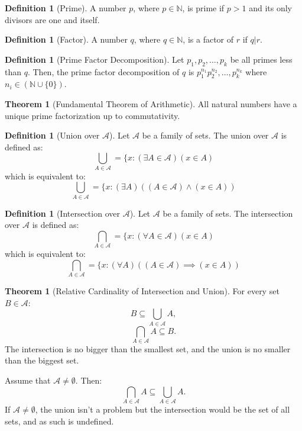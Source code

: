 \documentclass[10pt]{article}
\theoremstyle{definition}
\newtheorem{definition}[equation]{Definition}
\newtheorem{theorem}[equation]{Theorem}
\newcommand{\N}{\mathbb{N}}
\begin{document}
\begin{definition}[Prime]
    A number $p$, where $p\in\N$, is prime if $p>1$ and its only divisors are one and itself.
\end{definition}

\begin{definition}[Factor]
  A number $q$, where $q\in\N$, is a factor of $r$ if $q|r$.
\end{definition}

\begin{definition}[Prime Factor Decomposition]
  Let $p_1,p_2,\dots,p_k$ be all primes less than $q$. Then, the prime factor decomposition of $q$ is $p_1^{n_1} p_2^{n_2},\dots, p_k^{n_k}$ where $n_i\in(\N\cup \{0\})$.
\end{definition}

\begin{theorem}[Fundamental Theorem of Arithmetic]
  All natural numbers have a unique prime factorization up to commutativity.
\end{theorem}

\begin{definition}[Union over $\mathcal{A}$]
  Let $\mathcal{A}$ be a family of sets. The union over $\mathcal{A}$ is defined as:
  $$\bigcup_{A\in\mathcal{A}} = \{x: (\exists A\in\mathcal{A})(x\in A)$$
  which is equivalent to:
  $$\bigcup_{A\in\mathcal{A}} = \{x: (\exists A)((A\in\mathcal{A})\land(x\in A))$$
\end{definition}

\begin{definition}[Intersection over $\mathcal{A}$]
  Let $\mathcal{A}$ be a family of sets. The intersection over $\mathcal{A}$ is defined as:
  $$\bigcap_{A\in\mathcal{A}} = \{x: (\forall A\in\mathcal{A})(x\in A)$$
  which is equivalent to:
  $$\bigcap_{A\in\mathcal{A}} = \{x: (\forall A)((A\in\mathcal{A})\implies(x\in A))$$
\end{definition}

\begin{theorem}[Relative Cardinality of Intersection and Union]
  For every set $B\in\mathcal{A}$:
    $$B\subseteq \bigcup_{A\in\mathcal{A}} A,$$
    $$\bigcap_{A\in\mathcal{A}} A\subseteq B.$$
  The intersection is no bigger than the smallest set, and the union is no smaller than the biggest set.

  Assume that $\mathcal{A} \neq \emptyset$. Then:
    $$\bigcap_{A\in\mathcal{A}} A\subseteq \bigcup_{A\in\mathcal{A}} A.$$
  If $\mathcal{A} \neq \emptyset$, the union isn't a problem but the intersection would be the set of all sets, and as such is undefined.
\end{theorem}
\end{document}
